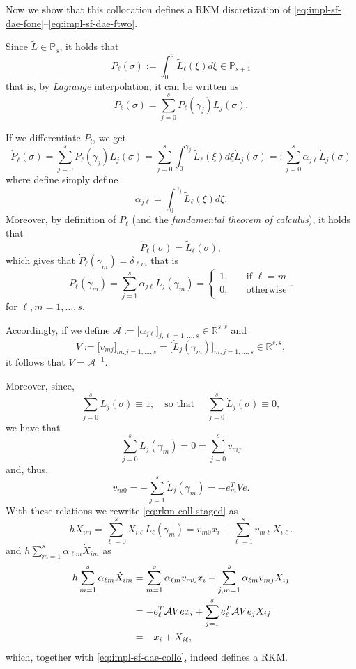 \documentclass[]{book}
\theoremstyle{definition}
\theoremstyle{definition}
\theoremstyle{definition}
\theoremstyle{remark}
\begin{document}
Now we show that this collocation defines a RKM discretization of \eqref{eq:impl-sf-dae-fone}--\eqref{eq:impl-sf-dae-ftwo}.

Since \(\tilde L \in \mathbb P_s\), it holds that
\[
P_\ell(\sigma):=\int_0^\sigma \tilde L_\ell (\xi)d\xi \in \mathbb P_{s+1}
\]
that is, by \emph{Lagrange} interpolation, it can be written as
\[
P_\ell(\sigma) = \sum_{j=0}^s P_\ell(\gamma_j)L_j(\sigma).
\]

If we differentiate \(P_l\), we get
\[
\dot P_\ell(\sigma) = \sum_{j=0}^s P_\ell(\gamma_j)\dot L_j(\sigma) = \sum_{j=0}^s \int_0^{\gamma_j} \tilde L_\ell (\xi)d\xi \dot L_j(\sigma)=: \sum_{j=0}^s \alpha_{j\ell} \dot L_j(\sigma)
\]
where define simply define
\[
\alpha_{j\ell} = \int_0^{\gamma_j} \tilde L_\ell (\xi)d\xi.
\]
Moreover, by definition of \(P_\ell\) (and the \emph{fundamental theorem of calculus}), it holds that
\[
\dot P_\ell(\sigma) = \tilde L_\ell(\sigma),
\]
which gives that \(\dot P_\ell(\gamma_m) = \delta_{\ell m}\) that is
\[
\dot P_\ell(\gamma_m) = \sum_{j=1}^s\alpha_{j\ell}\dot L_j(\gamma_m) = 
\begin{cases}
1, &\quad \text{if }\ell =m \\
0, &\quad \text{otherwise} 
\end{cases}.
\]
for \(\ell, m=1,\dotsc,s\).

Accordingly, if we define \(\mathcal A := \bigl[\alpha_{j\ell}\bigr]_{j,\ell=1,\dotsc,s} \in \mathbb R^{s,s}\) and
\[
V:=\bigl[v_{mj}\bigr]_{m,j=1,\dotsc,s} = \bigl[ \dot L_j(\gamma_m) \bigr]_{m,j=1,\dotsc,s} \in \mathbb R^{s,s} ,
\]
it follows that \(V=\mathcal A^{-1}\).

Moreover, since,
\[
\sum_{j=0}^s L_j(\sigma) \equiv 1, \quad\text{so that }\quad\sum_{j=0}^s \dot L_j(\sigma) \equiv 0,
\]
we have that
\[
\sum_{j=0}^s \dot L_j(\gamma_m) =0= \sum_{j=0}^s v_{mj}
\]
and, thus,
\[
v_{m0} = -\sum_{j=1}^s \dot L_j(\gamma_m) = -e_m^TVe.
\]
With these relations we rewrite \eqref{eq:rkm-coll-staged} as
\[
h\dot X_{im} = \sum_{\ell=0}^sX_{i\ell}\dot L_\ell(\gamma_m) = v_{m0}x_i + \sum_{\ell=1}^sv_{m\ell}X_{i\ell}.
\]
and \(h\sum_{m=1}^s\alpha_{\ell m} \dot X_{im}\) as
\begin{align}
  h\sum_{m=1}^s \alpha_{\ell m}\dot X_{im} &= \sum_{m=1}^s \alpha_{\ell m}v_{m0}x_i + \sum_{j,m=1}^s \alpha_{\ell m}v_{mj}X_{ij} \notag \\
  &= -e_\ell^T \mathcal AV e x_i + \sum_{j=1}^se_\ell^T \mathcal AVe_jX_{ij} \label{eq:collo-is-RKM-formula}\\
  &= -x_i + X_{i\ell}, \notag
\end{align}
which, together with \eqref{eq:impl-sf-dae-collo}, indeed defines a RKM.
\end{document}
